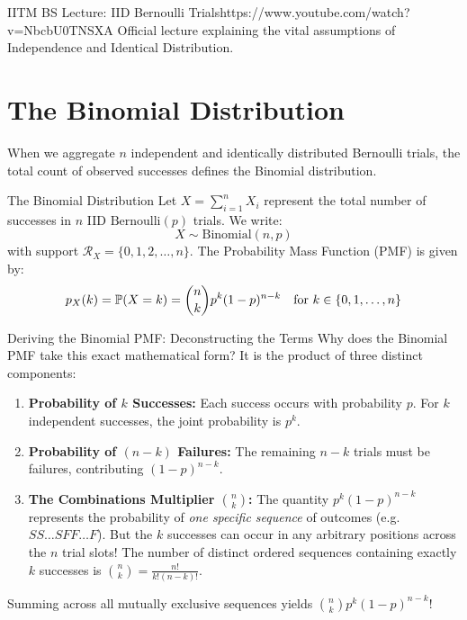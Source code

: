 \begin{videocard}{IITM BS Lecture: IID Bernoulli Trials}{https://www.youtube.com/watch?v=NbcbU0TNSXA}
Official lecture explaining the vital assumptions of Independence and Identical Distribution.
\end{videocard}

\section{The Binomial Distribution}

When we aggregate $n$ independent and identically distributed Bernoulli trials, the total count of observed successes defines the Binomial distribution.

\begin{definitionbox}{The Binomial Distribution}
Let $X = \sum_{i=1}^n X_i$ represent the total number of successes in $n$ IID $\text{Bernoulli}(p)$ trials. We write:
$$X \sim \text{Binomial}(n, p)$$
with support $\mathcal{R}_X = \{0, 1, 2, \dots, n\}$.
The Probability Mass Function (PMF) is given by:
$$p_X(k) = \P(X = k) = \binom{n}{k} p^k (1 - p)^{n - k} \quad \text{for } k \in \{0, 1, \dots, n\}$$
\end{definitionbox}

\begin{intuitionbox}{Deriving the Binomial PMF: Deconstructing the Terms}
Why does the Binomial PMF take this exact mathematical form? It is the product of three distinct components:
\begin{enumerate}
    \item \textbf{Probability of $k$ Successes:} Each success occurs with probability $p$. For $k$ independent successes, the joint probability is $p^k$.
    \item \textbf{Probability of $(n-k)$ Failures:} The remaining $n - k$ trials must be failures, contributing $(1-p)^{n-k}$.
    \item \textbf{The Combinations Multiplier $\binom{n}{k}$:} The quantity $p^k (1-p)^{n-k}$ represents the probability of \emph{one specific sequence} of outcomes (e.g. $S S \dots S F F \dots F$). But the $k$ successes can occur in any arbitrary positions across the $n$ trial slots! The number of distinct ordered sequences containing exactly $k$ successes is $\binom{n}{k} = \frac{n!}{k!(n-k)!}$.
\end{enumerate}
Summing across all mutually exclusive sequences yields $\binom{n}{k} p^k (1-p)^{n-k}$!
\end{intuitionbox}

